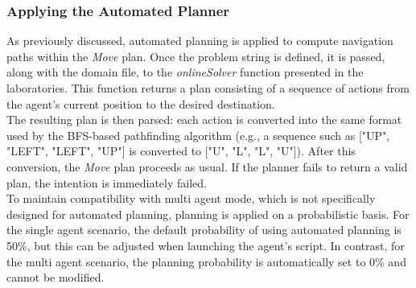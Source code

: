         \subsubsection{Applying the Automated Planner}
            As previously discussed, automated planning is applied to compute navigation paths within the \textit{Move} plan. Once the problem string is defined, it is passed, along with the domain file, to the \textit{onlineSolver} function presented in the laboratories. This function returns a plan consisting of a sequence of actions from the agent's current position to the desired destination.
            \medskip\\
            The resulting plan is then parsed: each action is converted into the same format used by the BFS-based pathfinding algorithm (e.g., a sequence such as ["UP", "LEFT", "LEFT", "UP"] is converted to ["U", "L", "L", "U"]). After this conversion, the \textit{Move} plan proceeds as usual. If the planner fails to return a valid plan, the intention is immediately failed.
            \medskip\\
            To maintain compatibility with multi agent mode, which is not specifically designed for automated planning, planning is applied on a probabilistic basis. For the single agent scenario, the default probability of using automated planning is 50\%, but this can be adjusted when launching the agent's script. In contrast, for the multi agent scenario, the planning probability is automatically set to 0\% and cannot be modified.

